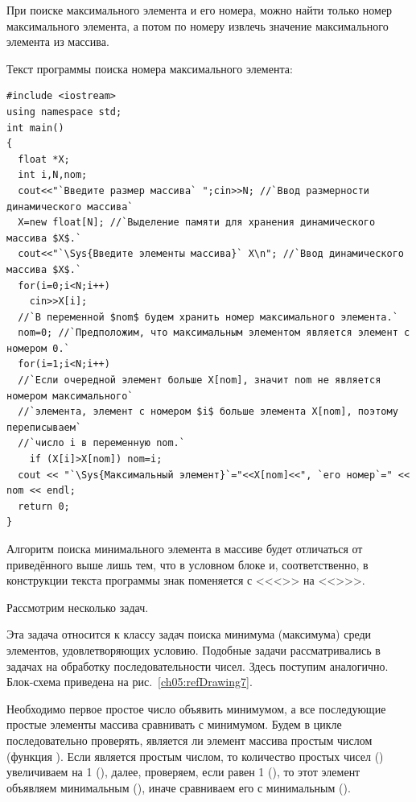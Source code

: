 При поиске максимального элемента и его номера, можно найти только номер максимального элемента, а потом по номеру извлечь
значение максимального элемента из массива.

Текст программы поиска номера максимального элемента:
\begin{lstlisting}
#include <iostream>
using namespace std;
int main()
{
  float *X;
  int i,N,nom;
  cout<<"`Введите размер массива` ";cin>>N; //`Ввод размерности динамического массива`
  X=new float[N]; //`Выделение памяти для хранения динамического массива $X$.`
  cout<<"`\Sys{Введите элементы массива}` X\n"; //`Ввод динамического массива $X$.`
  for(i=0;i<N;i++)
    cin>>X[i];
  //`В переменной $nom$ будем хранить номер максимального элемента.` 
  nom=0; //`Предположим, что максимальным элементом является элемент с номером 0.`
  for(i=1;i<N;i++)
  //`Если очередной элемент больше X[nom], значит nom не является номером максимального`
  //`элемента, элемент с номером $i$ больше элемента X[nom], поэтому переписываем`
  //`число i в переменную nom.`
    if (X[i]>X[nom]) nom=i;
  cout << "`\Sys{Максимальный элемент}`="<<X[nom]<<", `его номер`=" << nom << endl;
  return 0;
}
\end{lstlisting}

 Алгоритм поиска минимального элемента в массиве будет отличаться от приведённого выше лишь тем, что в
условном блоке и, соответственно, в конструкции  текста программы знак поменяется с <<{<}>> на <<{>}>>.

Рассмотрим несколько задач.


Эта задача относится к классу задач поиска минимума (максимума) среди элементов, удовлетворяющих условию. Подобные
задачи рассматривались в задачах на обработку последовательности чисел. Здесь поступим аналогично. Блок-схема приведена
на рис.~\ref{ch05:refDrawing7}.

Необходимо первое простое число объявить минимумом, а все последующие простые элементы массива сравнивать с минимумом.
Будем в цикле последовательно проверять, является ли элемент массива простым числом (функция
). Если  является простым числом, то количество простых чисел
() увеличиваем на 1 (), далее, проверяем, если равен 1
(), то этот элемент объявляем минимальным (), иначе
сравниваем его с минимальным ().


